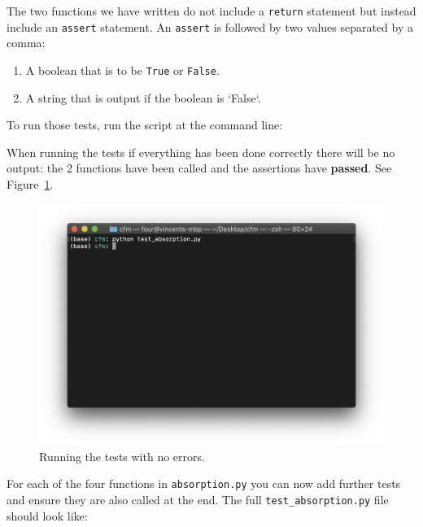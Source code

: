 \begin{note}
The two functions we have written do not include a \texttt{return} statement but
instead include an \texttt{assert} statement. An \texttt{assert} is followed by two values
separated by a comma:
\begin{enumerate}

\item 

A boolean that is to be \texttt{True} or \texttt{False}.

\item 

A string that is output if the boolean is `False`.

\end{enumerate}
\end{note}



To run those tests, run the script at the command line:



When running the tests if everything has been done correctly there will be no
output: the 2 functions have been called and the assertions have
\textbf{passed}. See Figure~\ref{fig:running_tests_with_no_errors}.

\begin{figure}[htbp]
\centering

\includegraphics[width=0.750\linewidth]{./assets/running_tests_with_no_errors/main.png}
\caption{Running the tests with no errors.}
\label{fig:running_tests_with_no_errors}
\end{figure}


For each of the four functions in \texttt{absorption.py} you can now add further tests
and ensure they are also called at the end. The full \texttt{test\_absorption.py} file
should look like:

